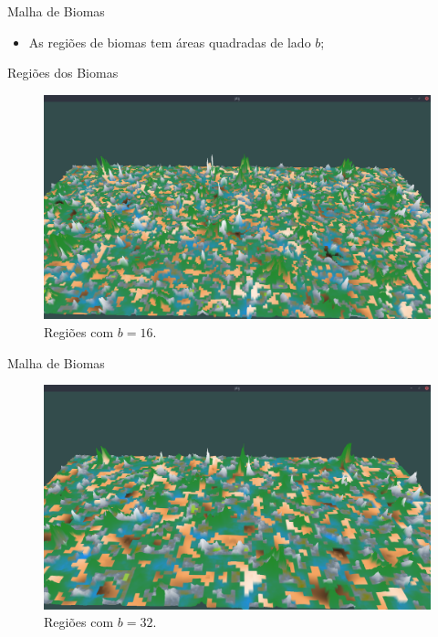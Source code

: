\begin{frame}{Malha de Biomas}
    \begin{itemize} \setlength\itemsep{1em}
        \item As regiões de biomas tem áreas quadradas de lado $b$;
    \end{itemize}
\end{frame}

\begin{frame}{Regiões dos Biomas}
    \begin{figure}[H]
        \centering
        \includegraphics[width=.9\textwidth]{img/re2bfb/b/16f4.png}
        \caption{Regiões com $b = 16$.}
        \label{fig:img_re2bfb_b_16f4}
    \end{figure}
    
    
\end{frame}

\begin{frame}{Malha de Biomas}
    \begin{figure}[H]
        \centering
        \includegraphics[width=.9\textwidth]{img/re2bfb/b/32f4.png}
        \caption{Regiões com $b = 32$.}
        \label{fig:img_re2bfb_b_32f4}
    \end{figure}
    
    
\end{frame}

